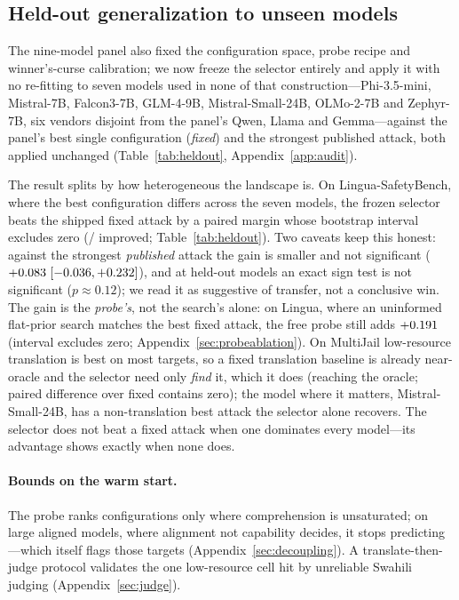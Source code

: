 \documentclass{article}
\begin{document}
\subsection{Held-out generalization to unseen models}
\label{sec:heldout}
The nine-model panel also fixed the configuration space, probe recipe and winner's-curse calibration; we now freeze the selector entirely and apply it with no re-fitting to seven models used in none of that construction---Phi-3.5-mini, Mistral-7B, Falcon3-7B, GLM-4-9B, Mistral-Small-24B, OLMo-2-7B and Zephyr-7B, six vendors disjoint from the panel's Qwen, Llama and Gemma---against the panel's best single configuration (\emph{fixed}) and the strongest published attack, both applied unchanged (Table~\ref{tab:heldout}, Appendix~\ref{app:audit}).

The result splits by how heterogeneous the landscape is. On Lingua-SafetyBench, where the best configuration differs across the seven models, the frozen selector beats the shipped fixed attack by a paired margin whose bootstrap interval excludes zero (\pjhoLGadaptwins/\pjhoLGn{} improved; Table~\ref{tab:heldout}). Two caveats keep this honest: against the strongest \emph{published} attack the gain is smaller and not significant ($+0.083$\,$[-0.036, +0.232]$), and at \pjhoLGn{} held-out models an exact sign test is not significant ($p\approx0.12$); we read it as suggestive of transfer, not a conclusive win. The gain is the \emph{probe's}, not the search's alone: on Lingua, where an uninformed flat-prior search matches the best fixed attack, the free probe still adds $+0.191$ (interval excludes zero; Appendix~\ref{sec:probeablation}). On MultiJail low-resource translation is best on most targets, so a fixed translation baseline is already near-oracle and the selector need only \emph{find} it, which it does (reaching the oracle; paired difference over fixed contains zero); the \pjhoMJadaptwins{} model where it matters, Mistral-Small-24B, has a non-translation best attack the selector alone recovers. The selector does not beat a fixed attack when one dominates every model---its advantage shows exactly when none does.


\paragraph{Bounds on the warm start.} The probe ranks configurations only where comprehension is unsaturated; on large aligned models, where alignment not capability decides, it stops predicting---which itself flags those targets (Appendix~\ref{sec:decoupling}). A translate-then-judge protocol validates the one low-resource cell hit by unreliable Swahili judging (Appendix~\ref{sec:judge}).
\end{document}
